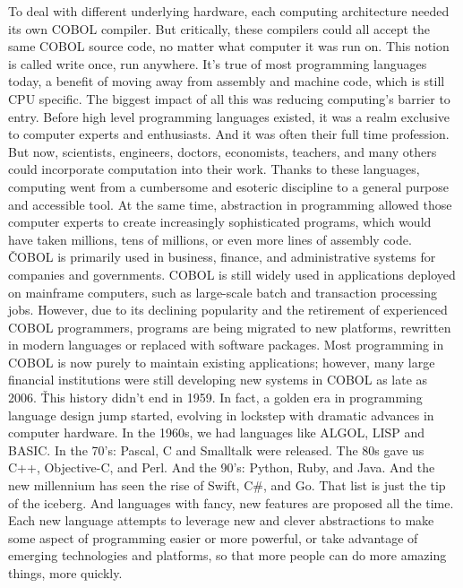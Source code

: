 To deal with different underlying hardware, each computing architecture needed its own COBOL compiler. But
critically, these compilers could all accept the same COBOL source code, no matter what computer it was run on. This
notion is called write once, run anywhere. It's true of most programming languages today, a benefit of moving away
from assembly and machine code, which is still CPU specific. The biggest impact of all this was reducing computing's
barrier to entry. Before high level programming languages existed, it was a realm exclusive to computer experts and
enthusiasts. And it was often their full time profession. But now, scientists, engineers, doctors, economists,
teachers, and many others could incorporate computation into their work. Thanks to these languages, computing went
from a cumbersome and esoteric discipline to a general purpose and accessible tool. At the same time, abstraction in
programming allowed those computer experts to create increasingly sophisticated programs, which would have taken
millions, tens of millions, or even more lines of assembly code. \v

COBOL is primarily used in business, finance, and administrative systems for companies and governments. COBOL is
still widely used in applications deployed on mainframe computers, such as large-scale batch and transaction
processing jobs. However, due to its declining popularity and the retirement of experienced COBOL programmers,
programs are being migrated to new platforms, rewritten in modern languages or replaced with software packages. Most
programming in COBOL is now purely to maintain existing applications; however, many large financial institutions were
still developing new systems in COBOL as late as 2006. \v

This history didn't end in 1959. In fact, a golden era in programming language design jump started, evolving in
lockstep with dramatic advances in computer hardware. In the 1960s, we had languages like ALGOL, LISP and BASIC. In
the 70's: Pascal, C and Smalltalk were released. The 80s gave us C++, Objective-C, and Perl. And the 90's: Python,
Ruby, and Java. And the new millennium has seen the rise of Swift, C\#, and Go. That list is just the tip of the
iceberg. And languages with fancy, new features are proposed all the time. Each new language attempts to leverage new
and clever abstractions to make some aspect of programming easier or more powerful, or take advantage of emerging
technologies and platforms, so that more people can do more amazing things, more quickly.